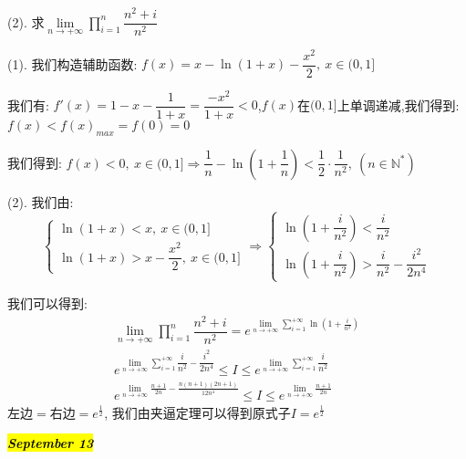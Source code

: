 (2). 求$\lim\limits_{n\rightarrow+\infty}\prod\limits_{i=1}^{n}\dfrac{n^2+i}{n^2}$
\begin{solution}

	(1). 我们构造辅助函数:  $f(x)=x-\ln(1+x)-\dfrac{x^2}{2},\ x\in(0,1]$
	
	我们有:  $f'(x)=1-x-\dfrac{1}{1+x}=\dfrac{-x^2}{1+x}<0$,$f(x)$在$(0,1]$上单调递减,我们得到:  $f(x)<f(x)_{max}=f(0)=0$
	
	我们得到:  $f(x)<0,\ x\in(0,1]\Rightarrow \dfrac{1}{n}-\ln(1+\dfrac{1}{n})<\dfrac{1}{2}\cdot\dfrac{1}{n^2},\ (n\in\mathbb{N}^{*})$
	
	(2). 我们由:  
	$$\left\lbrace
	\begin{array}{l}
		\ln(1+x)<x,\ x\in(0,1]\\
		\ln(1+x)>x-\dfrac{x^2}{2},\ x\in(0,1]
	\end{array}
	\right. \Rightarrow \left\lbrace
	\begin{array}{l}
		\ln(1+\dfrac{i}{n^2})<\dfrac{i}{n^2}\\
		\ln(1+\dfrac{i}{n^2})>\dfrac{i}{n^2}-\dfrac{i^2}{2n^4}
	\end{array}
	\right. $$
	
	我们可以得到:  
	\begin{eqnarray*}
		\lim\limits_{n\rightarrow+\infty}\prod\limits_{i=1}^{n}\dfrac{n^2+i}{n^2}=e^{\lim\limits_{n\rightarrow+\infty}\sum\limits_{i=1}^{+\infty}\ln(1+\frac{i}{n^2})}\\
		e^{\lim\limits_{n\rightarrow+\infty}\sum\limits_{i=1}^{+\infty}\dfrac{i}{n^2}-\dfrac{i^2}{2n^4}}\leq I\leq e^{\lim\limits_{n\rightarrow+\infty}\sum\limits_{i=1}^{+\infty}\dfrac{i}{n^2}}\\
		e^{\lim\limits_{n\rightarrow+\infty}\frac{n+1}{2n}-\frac{n(n+1)(2n+1)}{12n^4}}\leq I\leq e^{\lim\limits_{n\rightarrow+\infty}\frac{n+1}{2n}}
	\end{eqnarray*}
	$\text{左边}=\text{右边}=e^{\frac{1}{2}}$,
	我们由夹逼定理可以得到原式子$I=e^{\frac{1}{2}}$
\end{solution}

\hl{\textbf{\textit{September 13}}}

